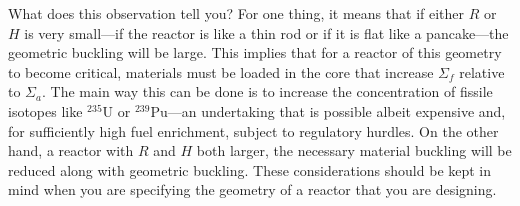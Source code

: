 What does this observation tell you?  For one thing, it means that if either $R$ or $H$ is very small---if the reactor is like a thin rod or if it is flat like a pancake---the geometric buckling will be large.  This implies that for a reactor of this geometry to become critical, materials must be loaded in the core that increase $\Sigma_f$ relative to $\Sigma_a$.  The main way this can be done is to increase the concentration of fissile isotopes like $^{235}\text{U}$ or $^{239}\text{Pu}$---an undertaking that is possible albeit expensive and, for sufficiently high fuel enrichment, subject to regulatory hurdles.  On the other hand, a reactor with $R$ and $H$ both larger, the necessary material buckling will be reduced along with geometric buckling.  These considerations should be kept in mind when you are specifying the geometry of a reactor that you are designing.





